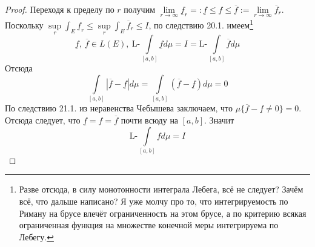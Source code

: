 \documentclass[11pt,a4paper]{report}
\theoremstyle{definition}
\theoremstyle{definition}
\theoremstyle{definition}
\begin{document}
\begin{proof}
		Переходя к пределу по $ r $ получим
		$
			\lim\limits_{r\to\infty} \underline{f}_{r} =: \underline{f} \le f \le \overline{f} :=  \lim\limits_{r\to\infty} \overline{f}_{r}
		$.\\
		Поскольку $ \sup\limits_{r} \int_{E} \underline{f}_{r} \le \sup\limits_{r} \int_{E} \overline{f}_{r} \le I $, по следствию  20.1. имеем\footnote{Разве отсюда, в силу монотонности интеграла Лебега, всё не следует? Зачём всё, что дальше написано? Я уже молчу про то, что интегрируемость по Риману на брусе влечёт ограниченность на этом брусе, а по критерию всякая ограниченная функция на множестве конечной меры интегрируема по Лебегу.}
		\[ \underline{f},\ \overline{f} \in L(E),\ \mbox{L-}\int\limits_{[a, b]} \underline{f} d\mu = I = \mbox{L-}\int\limits_{[a, b]} \overline{f} d\mu \]
		Отсюда 
		\[ 
			\int\limits_{[a, b]} | \overline{f} - \underline{f} | d\mu = \int\limits_{[a, b]} (\overline{f} - \underline{f}) d\mu = 0
		\]
		По следствию 21.1. из неравенства Чебышева заключаем, что $ \mu \{\overline{f} - \underline{f} \neq 0 \} = 0 $.\\
		Отсюда следует, что $ \underline{f} = f = \overline{f} $ почти всюду на $ [a, b] $. Значит\\
		\[
			\mbox{L-}\int\limits_{[a, b]} f d\mu = I
		\]
	\end{proof}
\end{document}
